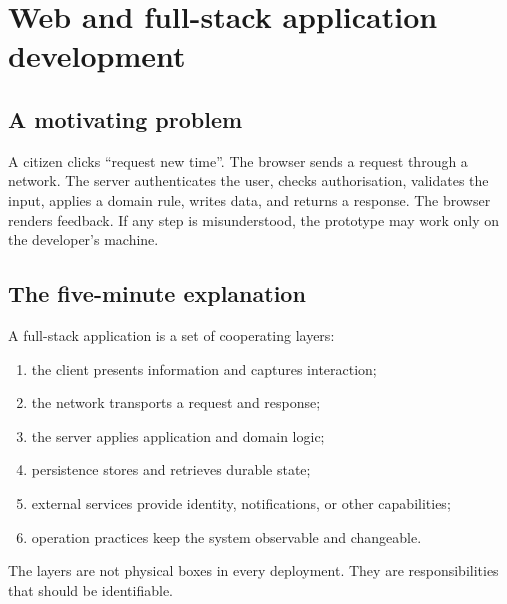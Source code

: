 \chapter{Web and full-stack application development}
\label{ch:web}

\section{A motivating problem}
A citizen clicks \enquote{request new time}. The browser sends a request through a network. The server authenticates the user, checks authorisation, validates the input, applies a domain rule, writes data, and returns a response. The browser renders feedback. If any step is misunderstood, the prototype may work only on the developer's machine.


\section{The five-minute explanation}
A full-stack application is a set of cooperating layers:
\begin{enumerate}
\item the client presents information and captures interaction;
\item the network transports a request and response;
\item the server applies application and domain logic;
\item persistence stores and retrieves durable state;
\item external services provide identity, notifications, or other capabilities;
\item operation practices keep the system observable and changeable.
\end{enumerate}
The layers are not physical boxes in every deployment. They are responsibilities that should be identifiable.


